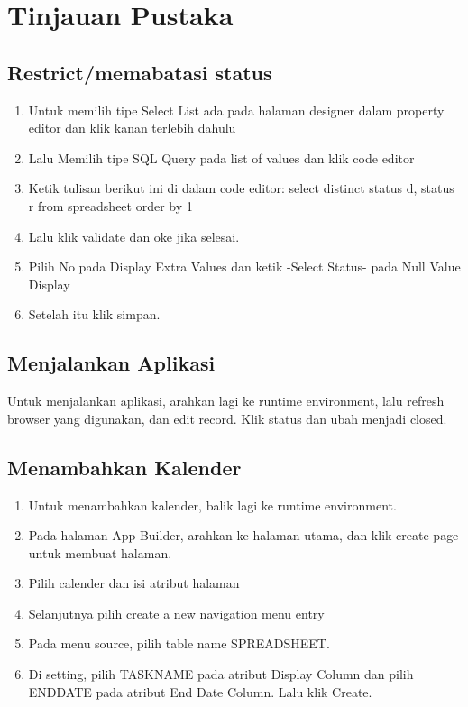 \chapter{Tinjauan Pustaka}


\section{Restrict/memabatasi status}
\begin{enumerate}
    \item Untuk memilih tipe Select List ada pada halaman designer dalam property editor dan klik kanan terlebih dahulu
\item Lalu Memilih tipe SQL Query pada list of values dan klik code editor
\item Ketik tulisan berikut ini di dalam code editor:
select distinct status d, status r 
from spreadsheet
order by 1
\item	Lalu klik validate dan oke jika selesai.
\item	Pilih No pada Display Extra Values dan ketik -Select Status- pada Null Value Display
\item	Setelah itu klik simpan.

\end{enumerate}


\section{Menjalankan Aplikasi}
\par Untuk menjalankan aplikasi, arahkan lagi ke runtime environment, lalu refresh browser yang digunakan, dan edit record. Klik status dan ubah menjadi closed.


\section{Menambahkan Kalender}
\begin{enumerate}
\item Untuk menambahkan kalender, balik lagi ke runtime environment. 
\item	Pada halaman App Builder, arahkan ke halaman utama, dan klik create page untuk membuat halaman.
\item	Pilih calender dan isi atribut halaman
\item	Selanjutnya pilih create a new navigation menu entry
\item	Pada menu source, pilih table name SPREADSHEET.
\item	Di setting, pilih TASKNAME pada atribut Display Column dan pilih ENDDATE pada atribut End Date Column. Lalu klik Create.
\end{enumerate}

